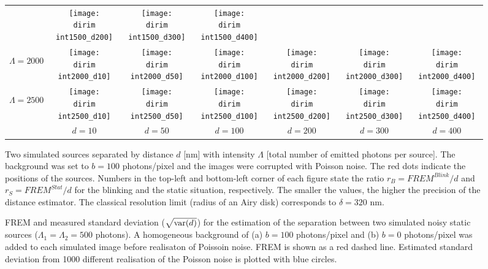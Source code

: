 \begin{figure}[!bt]
\begin{tabular}{c|cccccc}
		&\texttt{[image: \\dirim int1500\_d200]}
		&\texttt{[image: \\dirim int1500\_d300]}
		&\texttt{[image: \\dirim int1500\_d400]}\\		
		\begin{sideways}\hspace{\vs cm}$\Lambda=2000$\end{sideways}
		&\texttt{[image: \\dirim int2000\_d10]}
		&\texttt{[image: \\dirim int2000\_d50]}
		&\texttt{[image: \\dirim int2000\_d100]}
		&\texttt{[image: \\dirim int2000\_d200]}
		&\texttt{[image: \\dirim int2000\_d300]}
		&\texttt{[image: \\dirim int2000\_d400]}\\
		\begin{sideways}\hspace{\vs cm}$\Lambda=2500$\end{sideways}
		&\texttt{[image: \\dirim int2500\_d10]}
		&\texttt{[image: \\dirim int2500\_d50]}
		&\texttt{[image: \\dirim int2500\_d100]}
		&\texttt{[image: \\dirim int2500\_d200]}
		&\texttt{[image: \\dirim int2500\_d300]}
		&\texttt{[image: \\dirim int2500\_d400]}\\		
		\hline	
		&$d=10$ & $d=50$ & $d=100$ & $d=200$ & $d=300$ & $d=400$\\
	\end{tabular}
	\caption{Two simulated sources separated by distance $d$ [nm] with intensity $\Lambda$ [total number of emitted photons per source]. The background was set to $b=100$ photons/pixel and the images were corrupted with Poisson noise. The red dots indicate the positions of the sources. Numbers in the top-left and bottom-left corner of each figure state the ratio $r_B=\unit{FREM}^{Blink}/d$ and $r_S=\unit{FREM}^{Stat}/d$ for the blinking and the static situation, respectively. The smaller the values, the higher the precision of the distance estimator. The classical resolution limit (radius of an Airy disk) corresponds to $\delta=320$ nm.}
	\label{fig:two sources int d}
\end{figure}

\clearpage
\begin{figure}[!bh]
	\centering
	\newcommand{\wf}{.48\textwidth}
	\caption{FREM and measured standard deviation ($\sqrt{\mathrm{var}(d)}$) for the estimation of the separation between two simulated noisy static sources ($\Lambda_1=\Lambda_2=500$ photons). A homogeneous background of (a) $b=100$ photons/pixel and (b) $b=0$ photons/pixel was added to each simulated image before realisaton of Poissoin noise. FREM is shown as a red dashed line. Estimated standard deviation from 1000 different realisation of the Poisson noise is plotted with blue circles.}
\end{figure}


